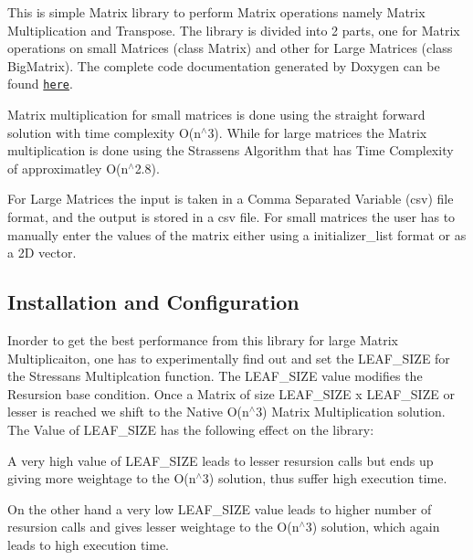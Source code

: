 This is simple Matrix library to perform Matrix operations namely Matrix Multiplication and Transpose. The library is divided into 2 parts, one for Matrix operations on small Matrices (class Matrix) and other for Large Matrices (class Big\+Matrix). The complete code documentation generated by Doxygen can be found \href{https://notu97.github.io/Matrix-Library/index.html}{\tt here}.

Matrix multiplication for small matrices is done using the straight forward solution with time complexity {\ttfamily O(n$^\wedge$3)}. While for large matrices the Matrix multiplication is done using the Strassen\textquotesingle{}s Algorithm that has Time Complexity of approximatley {\ttfamily O(n$^\wedge$2.8)}.

For Large Matrices the input is taken in a Comma Separated Variable (csv) file format, and the output is stored in a csv file. For small matrices the user has to manually enter the values of the matrix either using a initializer\+\_\+list format or as a 2D vector.

\subsection*{Installation and Configuration}

Inorder to get the best performance from this library for large Matrix Multiplicaiton, one has to experimentally find out and set the {\ttfamily L\+E\+A\+F\+\_\+\+S\+I\+ZE} for the Stressan\textquotesingle{}s Multiplcation function. The {\ttfamily L\+E\+A\+F\+\_\+\+S\+I\+ZE} value modifies the Resursion base condition. Once a Matrix of size {\ttfamily L\+E\+A\+F\+\_\+\+S\+I\+ZE} x {\ttfamily L\+E\+A\+F\+\_\+\+S\+I\+ZE} or lesser is reached we shift to the Native {\ttfamily O(n$^\wedge$3)} Matrix Multiplication solution. The Value of {\ttfamily L\+E\+A\+F\+\_\+\+S\+I\+ZE} has the following effect on the library\+:
\begin{DoxyItemize}
\item A very high value of {\ttfamily L\+E\+A\+F\+\_\+\+S\+I\+ZE} leads to lesser resursion calls but ends up giving more weightage to the {\ttfamily O(n$^\wedge$3)} solution, thus suffer high execution time.
\item On the other hand a very low {\ttfamily L\+E\+A\+F\+\_\+\+S\+I\+ZE} value leads to higher number of resursion calls and gives lesser weightage to the {\ttfamily O(n$^\wedge$3)} solution, which again leads to high execution time.
\end{DoxyItemize}

